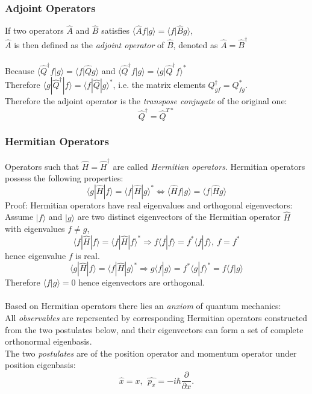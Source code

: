 	\subsubsection{Adjoint Operators}
	If two operators $\hat{A}$ and $\hat{B}$ satisfies
	$\langle \hat{A}f|g\rangle = \langle f|\hat{B}g\rangle$, \\
	$\hat{A}$ is then defined as the \emph{adjoint operator} of $\hat{B}$, denoted as $\hat{A} = \hat{B}^{\dag}$\\ \\
	Because $\langle \hat{Q}^{\dag}f | g \rangle = \langle f|\hat{Q}g\rangle$ 
	and $\langle \hat{Q}^{\dag}f | g \rangle = \langle g| \hat{Q}^{\dag}f \rangle^{*}$\\
	Therefore $\langle g| \hat{Q}^{\dag}|f \rangle = \langle f|\hat{Q} |g\rangle^{*}$, i.e. the matrix elements $Q^{\dag}_{gf} = Q^{*}_{fg}$.\\
	Therefore the adjoint operator is the \emph{transpose conjugate} of the original one:
	\[\hat{Q}^{\dag} = \hat{Q}^{T*}\]
	
	\subsubsection{Hermitian Operators}\label{calc}
	Operators such that $\hat{H} = \hat{H}^{\dag}$ are called \emph{Hermitian operators}. Hermitian operators possess the following properties:
	\[\langle g| \hat{H} |f \rangle = \langle f|\hat{H} |g\rangle^{*} \Leftrightarrow \langle \hat{H}f|g\rangle = \langle f|\hat{H}g\rangle\]
	Proof: Hermitian operators have real eigenvalues and orthogonal eigenvectors:\\
	Assume $|f\rangle$ and $|g\rangle$ are two distinct eigenvectors of the Hermitian operator $\hat{H}$ with eigenvalues $f\neq g$, \\
	\[\langle f| \hat{H} |f \rangle = \langle f|\hat{H} |f\rangle^{*} \Rightarrow f\langle f|f \rangle = f^{*}\langle f|f\rangle, \ f = f^*\]
	 hence eigenvalue $f$ is real.\\
	\[\langle g| \hat{H} |f \rangle = \langle f|\hat{H} |g\rangle^{*} 
	\Rightarrow g\langle f|g\rangle = f^*\langle g|f\rangle^* = f\langle f|g\rangle\]
	Therefore $\langle f|g\rangle=0$ hence eigenvectors are orthogonal. \\ \\
	Based on Hermitian operators there lies an \emph{anxiom} of quantum mechanics:\\
	All \emph{observables} are repersented by corresponding Hermitian operators constructed from the two postulates below, 
	and their eigenvectors can form a set of complete orthonormal eigenbasis.\\
	The two \emph{postulates} are of the position operator and momentum operator under position eigenbasis:
	\[\hat{x} = x, \ \ \hat{p_x} = -i\hbar\frac{\partial}{\partial x}.\]
	
